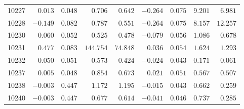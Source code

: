 {\begin{longtable}{l|rrrr|rrrr}
10227&$ 0.013$&$0.048$&$   0.706$&$  0.642$&$-0.264$&$0.075$&$  9.201$&$  6.981$\tabularnewline
10228&$-0.149$&$0.082$&$   0.787$&$  0.551$&$-0.264$&$0.075$&$  8.157$&$ 12.257$\tabularnewline
10230&$ 0.060$&$0.052$&$   0.525$&$  0.478$&$-0.079$&$0.056$&$  1.086$&$  0.678$\tabularnewline
10231&$ 0.477$&$0.083$&$ 144.754$&$ 74.848$&$ 0.036$&$0.054$&$  1.624$&$  1.293$\tabularnewline
10232&$ 0.050$&$0.051$&$   0.573$&$  0.424$&$-0.024$&$0.043$&$  0.171$&$  0.061$\tabularnewline
10237&$ 0.005$&$0.048$&$   0.854$&$  0.673$&$ 0.021$&$0.051$&$  0.567$&$  0.507$\tabularnewline
10238&$-0.003$&$0.447$&$   1.172$&$  1.195$&$-0.015$&$0.043$&$  0.662$&$  0.259$\tabularnewline
10240&$-0.003$&$0.447$&$   0.677$&$  0.614$&$-0.041$&$0.046$&$  0.737$&$  0.285$\tabularnewline
\hline
\end{longtable}}


